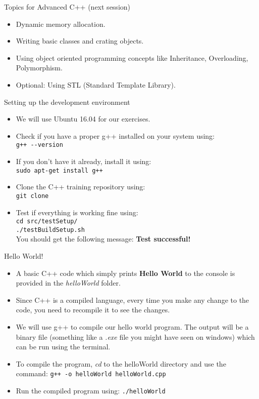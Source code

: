 \documentclass[aspectratio=169]{beamer}
\begin{document}
\begin{frame}{Topics for Advanced C++ (next session)}
	\begin{itemize}
		\item Dynamic memory allocation.
		\item Writing basic classes and crating objects.
		\item Using object oriented programming concepts like Inheritance, Overloading, Polymorphism.
		\item Optional: Using STL (Standard Template Library).
	\end{itemize}
\end{frame}

\begin{frame}[fragile]{Setting up the development environment}
	\begin{itemize}
		\item We will use Ubuntu 16.04 for our exercises.
		\item Check if you have a proper g++ installed on your system using:\\ \verb|g++ --version|
		\item If you don't have it already, install it using:\\ \verb|sudo apt-get install g++|
		\item Clone the C++ training repository using: \\ \verb|git clone |
		\item Test if everything is working fine using: \\ \verb|cd src/testSetup/| \\ \verb|./testBuildSetup.sh| \\ You should get the following message: \textbf{Test successful!}
	\end{itemize}
\end{frame}

\begin{frame}[fragile]{Hello World!}
	\begin{itemize}
		\item A basic C++ code which simply prints \textbf{Hello World} to the console is provided in the \textit{helloWorld} folder.
		\item Since C++ is a compiled language, every time you make any change to the code, you need to recompile it to see the changes.
		\item We will use g++ to compile our hello world program. The output will be a binary file (something like a \textit{.exe} file you might have seen on windows) which can be run using the terminal.
		\item To compile the program, \textit{cd} to the helloWorld directory and use the command: \verb|g++ -o helloWorld helloWorld.cpp|
		\item Run the compiled program using: \verb|./helloWorld|
	\end{itemize}
\end{frame}
\end{document}
